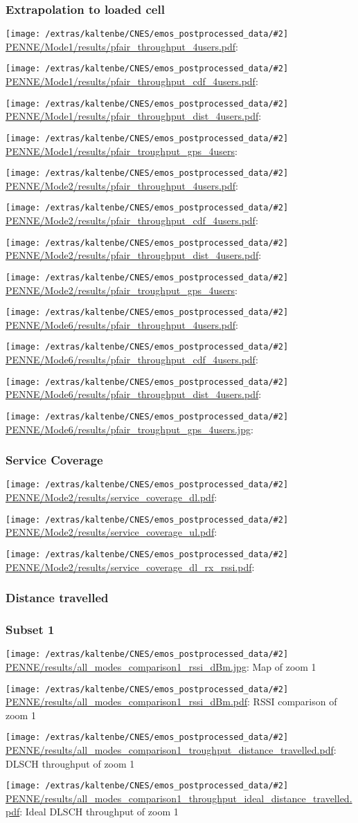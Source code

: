 \documentclass[a4paper,10pt]{article}
\newcommand{\printfile}[2][]{
 \begin{minipage}{8cm}
  \centering
  \texttt{[image: /extras/kaltenbe/CNES/emos\_postprocessed\_data/\#2]}
  \url{#2}: #1

 \end{minipage}
}
\begin{document}
\subsubsection{Extrapolation to loaded cell}

\printfile{PENNE/Mode1/results/pfair_throughput_4users.pdf}
\printfile{PENNE/Mode1/results/pfair_throughput_cdf_4users.pdf}

\printfile{PENNE/Mode1/results/pfair_throughput_dist_4users.pdf}
\printfile{PENNE/Mode1/results/pfair_troughput_gps_4users}

\printfile{PENNE/Mode2/results/pfair_throughput_4users.pdf}
\printfile{PENNE/Mode2/results/pfair_throughput_cdf_4users.pdf}

\printfile{PENNE/Mode2/results/pfair_throughput_dist_4users.pdf}
\printfile{PENNE/Mode2/results/pfair_troughput_gps_4users}

\printfile{PENNE/Mode6/results/pfair_throughput_4users.pdf}
\printfile{PENNE/Mode6/results/pfair_throughput_cdf_4users.pdf}

\printfile{PENNE/Mode6/results/pfair_throughput_dist_4users.pdf}
\printfile{PENNE/Mode6/results/pfair_troughput_gps_4users.jpg}

\subsubsection{Service Coverage}

\printfile{PENNE/Mode2/results/service_coverage_dl.pdf}
\printfile{PENNE/Mode2/results/service_coverage_ul.pdf}

\printfile{PENNE/Mode2/results/service_coverage_dl_rx_rssi.pdf}

\subsubsection{Distance travelled}
\label{sec:dist_travelled_penne}

\subsubsection*{Subset 1}

\printfile[Map of zoom 1]{PENNE/results/all_modes_comparison1_rssi_dBm.jpg}
\printfile[RSSI comparison of zoom 1]{PENNE/results/all_modes_comparison1_rssi_dBm.pdf}

\printfile[DLSCH throughput of zoom 1]{PENNE/results/all_modes_comparison1_troughput_distance_travelled.pdf}
\printfile[Ideal DLSCH throughput of zoom 1]{PENNE/results/all_modes_comparison1_throughput_ideal_distance_travelled.pdf}
\end{document}
